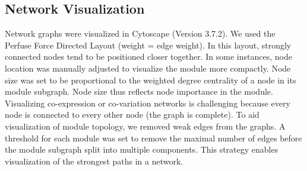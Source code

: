 \subsection{Network Visualization}
Network graphs were visualized in Cytoscape (Version 3.7.2). We
used the Perfuse Force Directed Layout (weight = edge weight). In this layout,
strongly connected nodes tend to be positioned closer together. In some
instances, node location was manually adjusted to visualize the module more
compactly. Node size was set to be proportional to the weighted degree
centrality of a node in its module subgraph. Node size thus reflects node
importance in the module. Visualizing co-expression or co-variation networks is
challenging because every node is connected to every other node (the graph is
complete). To aid visualization of module topology, we removed weak edges from
the graphs. A threshold for each module was set to remove the maximal number of
edges before the module subgraph split into multiple components. This strategy
enables visualization of the strongest paths in a network.
